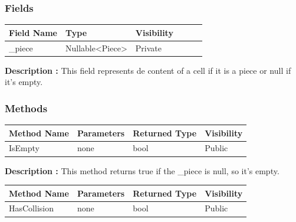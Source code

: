 \documentclass[12pt]{article}
\begin{document}
\subsubsection{Fields}

\begin{table}[H]
    \begin{tabular}{llllll}
    \hline
    \multicolumn{1}{|l|}{\cellcolor[HTML]{EFEFEF}\textbf{Field Name}} & \multicolumn{1}{l|}{\cellcolor[HTML]{EFEFEF}\textbf{Type}} & \multicolumn{1}{l|}{\cellcolor[HTML]{EFEFEF}\textbf{Visibility}} \\ \hline
    \multicolumn{1}{|l|}{\_piece}                                     & \multicolumn{1}{l|}{Nullable<Piece>}                       & \multicolumn{1}{l|}{Private}                                     \\ \hline
    \end{tabular}
\end{table}

\textbf{Description :} This field represents de content of a cell if it is a piece
or null if it's empty.

\subsubsection{Methods}

\begin{table}[H]
    \begin{tabular}{|l|l|l|l|}
    \hline
    \rowcolor[HTML]{EFEFEF} 
    \cellcolor[HTML]{EFEFEF}\textbf{Method Name} & \textbf{Parameters}    & \textbf{Returned Type} & \textbf{Visibility} \\ \hline
    IsEmpty                                      & none                   & bool                   & Public              \\ \hline
    \end{tabular}
\end{table}

\textbf{Description :} This method returns true if the \_piece is null, so it's empty.

\begin{table}[H]
    \begin{tabular}{|l|l|l|l|}
    \hline
    \rowcolor[HTML]{EFEFEF} 
    \cellcolor[HTML]{EFEFEF}\textbf{Method Name} & \textbf{Parameters}     & \textbf{Returned Type} & \textbf{Visibility} \\ \hline
    HasCollision                                 & none                    & bool                   & Public              \\ \hline
    \end{tabular}
\end{table}
\end{document}
